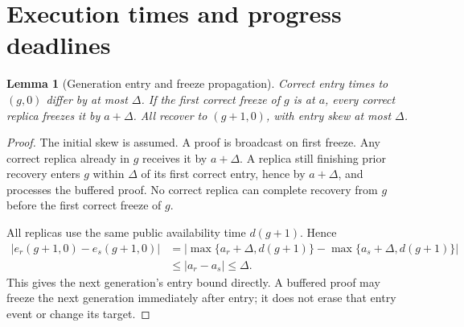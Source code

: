 \documentclass[11pt,a4paper]{article}
\newtheorem{lemma}[lemma]{Lemma}
\begin{document}
\section{Execution times and progress deadlines}
\label{sec:timing}
\begin{lemma}[Generation entry and freeze propagation]
\label{lem:entry}
Correct entry times to $(g,0)$ differ by at most $\Delta$. If the first
correct freeze of $g$ is at $a$, every correct replica freezes it by
$a+\Delta$. All recover to $(g+1,0)$, with entry skew at most $\Delta$.
\end{lemma}
\begin{proof}
The initial skew is assumed. A proof is broadcast on first freeze.
Any correct replica already in $g$ receives it by $a+\Delta$.
A replica still finishing prior recovery enters $g$ within $\Delta$
of its first correct entry, hence by $a+\Delta$, and processes the
buffered proof. No correct replica can complete recovery from $g$ before
the first correct freeze of $g$.

All replicas use the same public availability time $d(g+1)$. Hence
\[
\begin{aligned}
 |e_r(g+1,0)-e_s(g+1,0)|
 &=\big|\max\{a_r+\Delta,d(g+1)\}
          -\max\{a_s+\Delta,d(g+1)\}\big|\\
 &\le |a_r-a_s|\le\Delta.
\end{aligned}
\]
This gives the next generation's entry bound directly.
A buffered proof may freeze the next generation immediately after entry;
it does not erase that entry event or change its target.
\end{proof}
\end{document}

